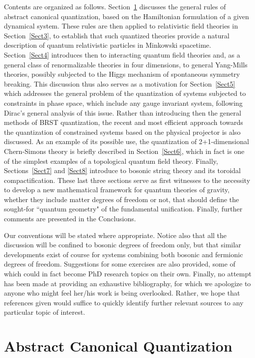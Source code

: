 \documentclass[a4paper,11pt]{article}
\begin{document}
Contents are organized as follows. Section~\ref{Sect2} discusses the
general rules of abstract canonical quantization, based on the
Hamiltonian formulation of a given dynamical system. These rules
are then applied to relativistic field theories in Section~\ref{Sect3},
to establish that such quantized theories provide a natural description
of quantum relativistic particles in Minkowski spacetime. Section~\ref{Sect4}
introduces then to interacting quantum field theories and, as a general
class of renormalizable theories in four dimensions, to general Yang-Mills
theories, possibly subjected to the Higgs mechanism of spontaneous
symmetry breaking. This discussion thus also serves as a motivation for
Section~\ref{Sect5} which addresses the general problem of the quantization
of systems subjected to constraints in phase space, which include any
gauge invariant system, following Dirac's general analysis of this 
issue.\cite{Dirac}
Rather than introducing then the ge\-ne\-ral methods of BRST quantization,
the recent and most efficient approach towards the quantization of constrained
systems based on the physical projector\cite{Klaud1} is also discussed. 
As an example
of its possible use, the quantization of 2+1-dimensional Chern-Simons
theory is briefly described in Section~\ref{Sect6}, which in fact is
one of the simplest examples of a topological quantum field theory.
Finally, Sections~\ref{Sect7} and \ref{Sect8} introduce to bosonic string
theory and its toroidal compac\-ti\-fication. These last three sections serve
as first witnesses to the necessity to develop a new mathematical
framework for quantum theories of gravity, whether they include
matter degrees of freedom or not, that should define the sought-for ``quantum
geometry" of the fundamental unification. Finally, further
comments are presented in the Conclusions.

Our conventions will be stated where appropriate. Notice also that
all the discussion will be confined to bosonic degrees of freedom
only, but that similar developments exist of course for systems
combining both bosonic and fermionic degrees of freedom. Suggestions for 
some exercises are also provided, some of which could in fact become 
PhD research topics on their own. Finally, no attempt has been made 
at providing an exhaustive bibliography, for which we apologize to anyone who
might feel her/his work is being overlooked. Rather, we hope that
references given would suffice to quickly identify further relevant
sources to any particular topic of interest.


\section{Abstract Canonical Quantization}
\label{Sect2}
\end{document}
